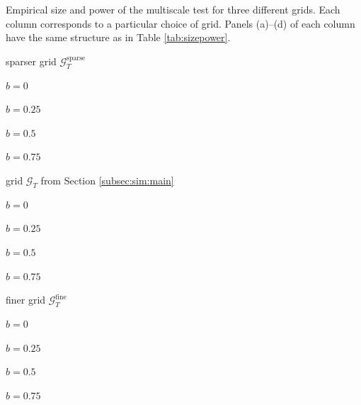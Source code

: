 \documentclass[12pt]{article}
\begin{document}
\begin{table}[t!]
\renewcommand{\arraystretch}{1.2}  
\footnotesize{
\begin{center}
\caption{Empirical size and power of the multiscale test for three different grids. Each column corresponds to a particular choice of grid. Panels (a)--(d) of each column have the same structure as in Table \ref{tab:sizepower}.}\label{tab:grids}
\begin{subtable}[b]{0.32\textwidth}
\setcounter{subtable}{0}    
\centering  
\caption*{sparser grid $\mathcal{G}_T^{\text{sparse}}$}\vspace{0.1cm} 
\caption{$b=0$}
\vspace{0.25cm}
\caption{$b=0.25$}
\vspace{0.25cm}
\caption{$b=0.5$}
\vspace{0.25cm}
\caption{$b=0.75$}

\end{subtable}
\begin{subtable}[b]{0.32\textwidth}
\setcounter{subtable}{0}  
\centering  
\caption*{grid $\mathcal{G}_T$ from Section \ref{subsec:sim:main}}\vspace{0.1cm} 
\caption{$b=0$}
\vspace{0.25cm}
\caption{$b=0.25$}
\vspace{0.25cm}
\caption{$b=0.5$}
\vspace{0.25cm}
\caption{$b=0.75$}

\end{subtable}
\begin{subtable}[b]{0.32\textwidth}
\setcounter{subtable}{0}    
\centering  
\caption*{finer grid $\mathcal{G}_T^{\text{fine}}$}\vspace{0.1cm}
\caption{$b=0$}
\vspace{0.25cm}
\caption{$b=0.25$}
\vspace{0.25cm}
\caption{$b=0.5$}
\vspace{0.25cm}
\caption{$b=0.75$}

\end{subtable}
\end{center}}
\end{table}
\end{document}
